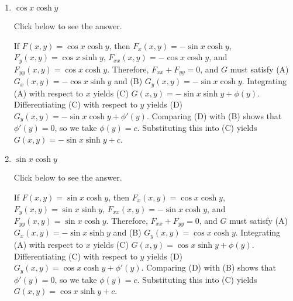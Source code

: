 \documentclass{ximera}
\begin{document}
\begin{problem}
\begin{enumerate}
    \item $\cos x\cosh y$

    Click below to see the answer.

    \begin{expandable}
        If $F(x,y)=\cos x\cosh y$, then $F_x(x,y)=-\sin x\cosh y$,
$F_y(x,y)=\cos x\sinh y$,
$F_{xx}(x,y)=-\cos x\cosh y$, and $F_{yy}(x,y)=\cos x\cosh y$.
Therefore, $F_{xx}+F_{yy}=0$, and $G$ must satisfy
(A) $G_x(x,y)=-\cos x\sinh y$ and (B) $G_y(x,y)=-\sin x\cosh y$.
Integrating (A) with respect to $x$ yields
(C) $G(x,y)=-\sin x\sinh y+\phi(y)$.
Differentiating (C) with respect to $y$  yields
(D) $G_y(x,y)=-\sin x\cosh y+\phi'(y)$.
Comparing (D) with (B)  shows that
$\phi'(y)=0$, so we take
$\phi(y)=c$.
Substituting this into (C) yields
$G(x,y)=-\sin x\sinh y+c$.
    \end{expandable}
    
    \item $\sin x\cosh y$

    Click below to see the answer.

    \begin{expandable}
        If $F(x,y)=\sin x\cosh y$, then $F_x(x,y)=\cos x\cosh y$,
 $F_y(x,y)=\sin x\sinh y$,
$F_{xx}(x,y)=-\sin x\cosh y$, and $F_{yy}(x,y)=\sin x\cosh y$.
Therefore, $F_{xx}+F_{yy}=0$, and $G$ must satisfy
(A) $G_x(x,y)=-\sin x\sinh y$ and (B) $G_y(x,y)=\cos x\cosh y$.
Integrating (A) with respect to $x$ yields
(C) $G(x,y)=\cos x\sinh y+\phi(y)$.
Differentiating (C) with respect to $y$  yields
(D) $G_y(x,y)=\cos x\cosh y+\phi'(y)$.
Comparing (D) with (B)  shows that
$\phi'(y)=0$, so we take
$\phi(y)=c$.
Substituting this into (C) yields
$G(x,y)=\cos x\sinh y+c$.
    \end{expandable}
\end{enumerate}
\end{problem}
\end{document}
